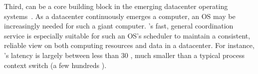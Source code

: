 % 


Third, \xxx can be a core building block in the emerging datacenter operating 
systems~\cite{matei:hotcloud11, mesos:nsdi11, datacenter:os}. As a 
datacenter continuously emerges a computer, an OS may be increasingly needed for 
such a giant computer. \xxx's fast, general coordination service is especially 
suitable for such an OS's scheduler to maintain a consistent, reliable view on 
both computing resources and data in a datacenter. For instance, \xxx's 
latency is largely between less than 30 \us, much smaller than a typical 
process context switch (a few hundreds \us).
